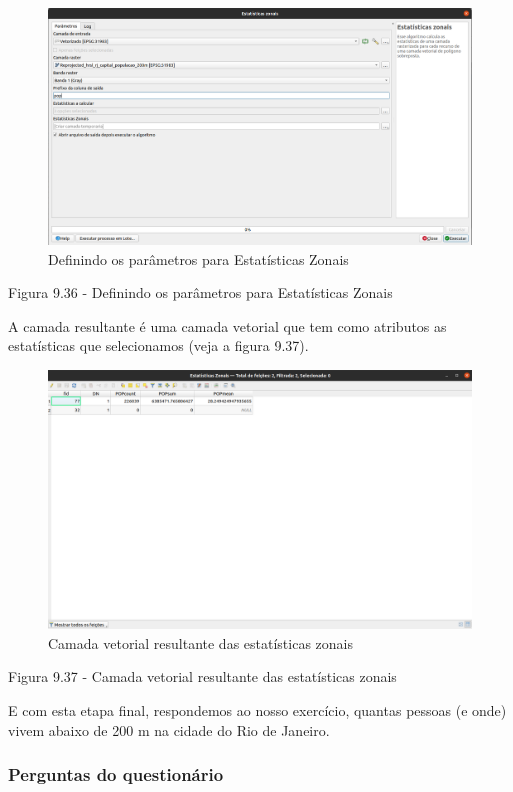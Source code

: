 \documentclass[
]{book}
\begin{document}
\begin{figure}
\centering
\includegraphics{media/modulo9/fig936.png}
\caption{Definindo os parâmetros para Estatísticas Zonais}
\end{figure}

Figura 9.36 - Definindo os parâmetros para Estatísticas Zonais

A camada resultante é uma camada vetorial que tem como atributos as estatísticas que selecionamos (veja a figura 9.37).

\begin{figure}
\centering
\includegraphics{media/modulo9/fig937.png}
\caption{Camada vetorial resultante das estatísticas zonais}
\end{figure}

Figura 9.37 - Camada vetorial resultante das estatísticas zonais

E com esta etapa final, respondemos ao nosso exercício, quantas pessoas (e onde) vivem abaixo de 200 m na cidade do Rio de Janeiro.

\hypertarget{perguntas-do-questionuxe1rio-19}{%
\subsubsection{\texorpdfstring{\textbf{Perguntas do questionário}}{Perguntas do questionário}}\label{perguntas-do-questionuxe1rio-19}}
\end{document}
